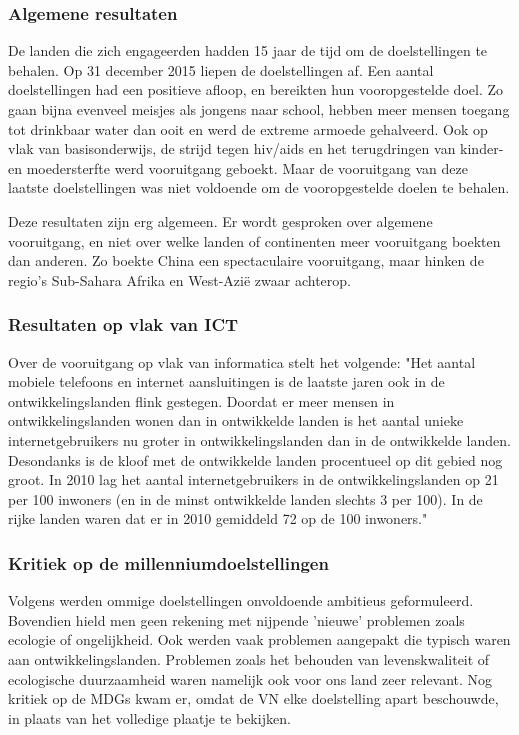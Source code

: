 \subsubsection{Algemene resultaten}
De landen die zich engageerden hadden 15 jaar de tijd om de doelstellingen te behalen. Op 31 december 2015 liepen de doelstellingen af.
Een aantal doelstellingen had een positieve afloop, en bereikten hun vooropgestelde doel. Zo gaan bijna evenveel meisjes als jongens naar school, hebben meer mensen toegang tot drinkbaar water dan ooit en werd de extreme armoede gehalveerd. Ook op vlak van basisonderwijs, de strijd tegen hiv/aids en het terugdringen van kinder- en moedersterfte werd vooruitgang geboekt. Maar de vooruitgang van deze laatste doelstellingen was niet voldoende om de vooropgestelde doelen te behalen. \autocite{Tierens2014}

Deze resultaten zijn erg algemeen. Er wordt gesproken over algemene vooruitgang, en niet over welke landen of continenten meer vooruitgang boekten dan anderen. Zo boekte China een spectaculaire vooruitgang, maar hinken de regio's Sub-Sahara Afrika en West-Azië zwaar achterop. \autocite{Tierens2014}
 
 \subsubsection{Resultaten op vlak van ICT}
Over de vooruitgang op vlak van informatica stelt \autocite{Kampherbeek2012} het volgende: "Het aantal mobiele telefoons en internet aansluitingen is de laatste jaren ook in de ontwikkelingslanden flink gestegen. Doordat er meer mensen in ontwikkelingslanden wonen dan in ontwikkelde landen is het aantal unieke internetgebruikers nu groter in ontwikkelingslanden dan in de ontwikkelde landen. Desondanks is de kloof met de ontwikkelde landen procentueel op dit gebied nog groot. In 2010 lag het aantal internetgebruikers in de ontwikkelingslanden op 21 per 100 inwoners (en in de minst ontwikkelde landen slechts 3 per 100). In de rijke landen waren dat er in 2010 gemiddeld 72 op de 100 inwoners."
 
 \subsubsection{Kritiek op de millenniumdoelstellingen}
 Volgens  \autocite{VN2015} werden ommige doelstellingen onvoldoende ambitieus geformuleerd. Bovendien hield men geen rekening met nijpende 'nieuwe' problemen zoals ecologie of ongelijkheid. Ook werden vaak problemen aangepakt die typisch waren aan ontwikkelingslanden. Problemen zoals het behouden van levenskwaliteit of ecologische duurzaamheid waren namelijk ook voor ons land zeer relevant. Nog kritiek op de MDGs kwam er, omdat de VN elke doelstelling apart beschouwde, in plaats van het volledige plaatje te bekijken. \autocite{VN2015}

